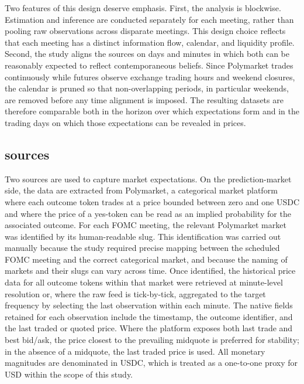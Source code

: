 Two features of this design deserve emphasis. First, the analysis is blockwise. Estimation and inference are conducted separately for each meeting, rather than pooling raw observations across disparate meetings. This design choice reflects that each meeting has a distinct information flow, calendar, and liquidity profile. Second, the study aligns the sources on days and minutes in which both can be reasonably expected to reflect contemporaneous beliefs. Since Polymarket trades continuously while futures observe exchange trading hours and weekend closures, the calendar is pruned so that non-overlapping periods, in particular weekends, are removed before any time alignment is imposed. The resulting datasets are therefore comparable both in the horizon over which expectations form and in the trading days on which those expectations can be revealed in prices.

\subsection{sources}

Two sources are used to capture market expectations. On the prediction-market side, the data are extracted from Polymarket, a categorical market platform where each outcome token trades at a price bounded between zero and one USDC and where the price of a yes-token can be read as an implied probability for the associated outcome. For each FOMC meeting, the relevant Polymarket market was identified by its human-readable slug. This identification was carried out manually because the study required precise mapping between the scheduled FOMC meeting and the correct categorical market, and because the naming of markets and their slugs can vary across time. Once identified, the historical price data for all outcome tokens within that market were retrieved at minute-level resolution or, where the raw feed is tick-by-tick, aggregated to the target frequency by selecting the last observation within each minute. The native fields retained for each observation include the timestamp, the outcome identifier, and the last traded or quoted price. Where the platform exposes both last trade and best bid/ask, the price closest to the prevailing midquote is preferred for stability; in the absence of a midquote, the last traded price is used. All monetary magnitudes are denominated in USDC, which is treated as a one-to-one proxy for USD within the scope of this study.

